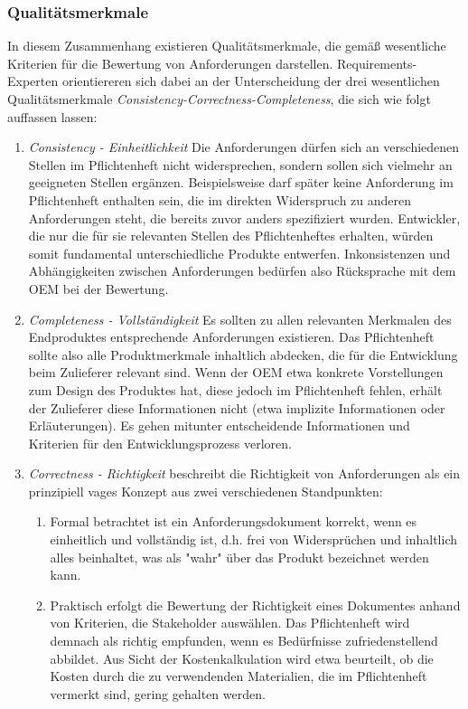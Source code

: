 \documentclass[12pt]{report}
\begin{document}
\subsubsection{Qualitätsmerkmale}
In diesem Zusammenhang existieren Qualitätsmerkmale, die gemäß \cite{zg02} wesentliche Kriterien für die Bewertung von Anforderungen darstellen. Requirements-Experten orientiereren sich dabei an der Unterscheidung der drei wesentlichen Qualitätsmerkmale \textit{Consistency-Correctness-Completeness}, die sich wie folgt auffassen lassen:

\begin{enumerate}
\item \textit{Consistency - Einheitlichkeit} Die Anforderungen dürfen sich an verschiedenen Stellen im Pflichtenheft nicht widersprechen, sondern sollen sich vielmehr an geeigneten Stellen ergänzen. Beispielsweise darf später keine Anforderung im Pflichtenheft enthalten sein, die im direkten Widerspruch zu anderen Anforderungen steht, die bereits zuvor anders spezifiziert wurden. Entwickler, die nur die für sie relevanten Stellen des Pflichtenheftes erhalten, würden somit fundamental unterschiedliche Produkte entwerfen. Inkonsistenzen und Abhängigkeiten zwischen Anforderungen bedürfen also Rücksprache mit dem OEM bei der Bewertung.
\item \textit{Completeness - Vollständigkeit} Es sollten zu allen relevanten Merkmalen des Endproduktes entsprechende Anforderungen existieren. Das Pflichtenheft sollte also alle Produktmerkmale inhaltlich abdecken, die für die Entwicklung beim Zulieferer relevant sind. Wenn der OEM etwa konkrete Vorstellungen zum Design des Produktes hat, diese jedoch im Pflichtenheft fehlen, erhält der Zulieferer diese Informationen nicht (etwa implizite Informationen oder Erläuterungen). Es gehen mitunter entscheidende Informationen und Kriterien für den Entwicklungsprozess verloren.
\item \textit{Correctness - Richtigkeit} \cite{zg02} beschreibt die Richtigkeit von Anforderungen als ein prinzipiell vages Konzept aus zwei verschiedenen Standpunkten:
\begin{enumerate}
\item Formal betrachtet ist ein Anforderungsdokument korrekt, wenn es einheitlich und vollständig ist, d.h. frei von Widersprüchen und inhaltlich alles beinhaltet, was als "wahr" über das Produkt bezeichnet werden kann.
\item Praktisch erfolgt die Bewertung der Richtigkeit eines Dokumentes anhand von Kriterien, die Stakeholder auswählen. Das Pflichtenheft wird demnach als richtig empfunden, wenn es Bedürfnisse zufriedenstellend abbildet. Aus Sicht der Kostenkalkulation wird etwa beurteilt, ob die Kosten durch die zu verwendenden Materialien, die im Pflichtenheft vermerkt sind, gering gehalten werden.
\end{enumerate}
\end{enumerate}
\end{document}
